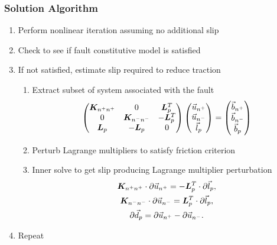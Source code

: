 \documentclass[aspectratio=169]{beamer}
\begin{document}
\begin{frame}
  \frametitle{Solution Algorithm}

  \begin{enumerate}
  \item Perform nonlinear iteration assuming no additional slip
  \item Check to see if fault constitutive model is satisfied
  \item If not satisfied, estimate slip required to reduce traction
    \begin{enumerate}
    \item Extract subset of system associated with the fault
      \begin{equation}
        \begin{pmatrix}
          \bm{K}_{n^+n^+} & 0 & \bm{L}_p^T  \\
          0 & \bm{K}_{n^-n^-} & -\bm{L}_p^T \\
          \bm{L}_p & -\bm{L}_p & 0
        \end{pmatrix}
        \begin{pmatrix}
          \vec{u}_{n^+} \\
          \vec{u}_{n^-} \\
          \vec{l}_p \\
        \end{pmatrix}
        =
        \begin{pmatrix}
          \vec{b}_{n^+} \\
          \vec{b}_{n^-} \\
          \vec{b}_p \\
        \end{pmatrix}
      \end{equation}
    \item Perturb Lagrange multipliers to satisfy friction criterion
    \item Inner solve to get slip producing Lagrange multiplier perturbation
      \vspace*{-2mm}
      \begin{gather}
        \bm{K}_{n^+n^+} \cdot \partial \vec{u}_{n^+} = 
        - \bm{L}_p^T \cdot \partial \vec{l}_p, \\
        \bm{K}_{n^-n^-} \cdot \partial \vec{u}_{n^-} =
        \bm{L}_p^T \cdot \partial \vec{l}_p, \\
        \partial \vec{d}_p =  \partial \vec{u}_{n^+} - \partial \vec{u}_{n^-}.        
      \end{gather}
    \end{enumerate}
  \item Repeat
  \end{enumerate}

\end{frame}
\end{document}

